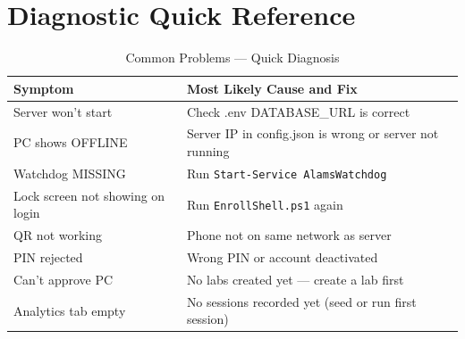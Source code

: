 \section{Diagnostic Quick Reference}

\begin{table}[h!]
\centering
\caption{Common Problems — Quick Diagnosis}
\label{tab:quick-diag}
\begin{tabularx}{\textwidth}{lX}
\toprule
\textbf{Symptom} & \textbf{Most Likely Cause and Fix}\\
\midrule
\rowcolor{aurxonlightgray}
Server won't start & Check .env DATABASE\_URL is correct\\
PC shows OFFLINE & Server IP in config.json is wrong or server not running\\
\rowcolor{aurxonlightgray}
Watchdog MISSING & Run \texttt{Start-Service AlamsWatchdog}\\
Lock screen not showing on login & Run \texttt{EnrollShell.ps1} again\\
\rowcolor{aurxonlightgray}
QR not working & Phone not on same network as server\\
PIN rejected & Wrong PIN or account deactivated\\
\rowcolor{aurxonlightgray}
Can't approve PC & No labs created yet — create a lab first\\
Analytics tab empty & No sessions recorded yet (seed or run first session)\\
\bottomrule
\end{tabularx}
\end{table}
